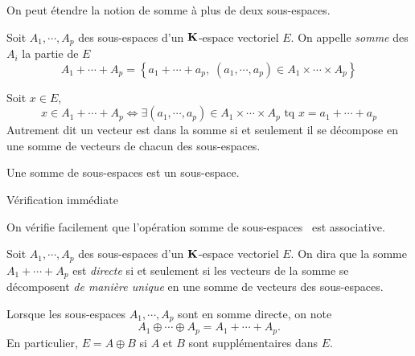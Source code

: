 On peut étendre la notion de somme à plus de deux sous-espaces.
\begin{defi}
Soit $A_1,\cdots,A_p$ des sous-espaces d'un $\mathbf{K}$-espace vectoriel $E$. On appelle \emph{somme} des $A_i$ la partie de $E$
\begin{displaymath}
  A_1 + \cdots + A_p = \left\lbrace a_1+\cdots+a_p,\; (a_1,\cdots,a_p)\in A_1\times\cdots\times A_p \right\rbrace 
\end{displaymath}
\end{defi}
\begin{rem}
  Soit $x\in E$,
\begin{displaymath}
  x\in A_1+\cdots +A_p \Leftrightarrow \exists (a_1,\cdots,a_p)\in A_1\times\cdots\times A_p \text{ tq } x = a_1+\cdots + a_p
\end{displaymath}
Autrement dit un vecteur est dans la somme si et seulement il se décompose en une somme de vecteurs de chacun des sous-espaces.
\end{rem}

\begin{prop}
  Une somme de sous-espaces est un sous-espace.
\end{prop}
\begin{demo}
  Vérification immédiate
\end{demo}
On vérifie facilement que l'opération \og somme de sous-espaces\fg~ est associative.
\begin{defi}
  Soit $A_1,\cdots,A_p$ des sous-espaces d'un $\mathbf{K}$-espace vectoriel $E$. On dira que la somme $A_1+\cdots + A_p$ est \emph{directe} si et seulement si
les vecteurs de la somme se décomposent \emph{de manière unique} en une somme de vecteurs des sous-espaces. 
\end{defi}
\begin{nota}
 Lorsque les sous-espaces $A_1,\cdots,A_p$ sont en somme directe, on note
\[
 A_1 \oplus \cdots \oplus A_p = A_1 + \cdots + A_p.
\]
En particulier, $E = A \oplus B$ si $A$ et $B$ sont supplémentaires dans $E$.
\end{nota}



